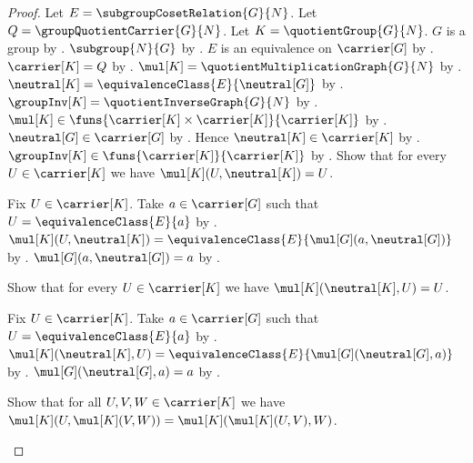 \begin{proof}
    Let $E=\subgroupCosetRelation{G}{N}$.
    Let $Q=\groupQuotientCarrier{G}{N}$.
    Let $K=\quotientGroup{G}{N}$.
    $G$ is a group by .
    $\subgroup{N}{G}$ by .
    $E$ is an equivalence on $\carrier[G]$ by
        .
    $\carrier[K]=Q$ by .
    $\mul[K]=\quotientMultiplicationGraph{G}{N}$ by
        .
    $\neutral[K]=\equivalenceClass{E}{\neutral[G]}$ by
        .
    $\groupInv[K]=\quotientInverseGraph{G}{N}$ by
        .
    $\mul[K]\in\funs{\carrier[K]\times\carrier[K]}{\carrier[K]}$ by
        .
    $\neutral[G]\in\carrier[G]$ by
        .
    Hence $\neutral[K]\in\carrier[K]$ by
        .
    $\groupInv[K]\in\funs{\carrier[K]}{\carrier[K]}$ by
        .
    Show that for every $U\in\carrier[K]$ we have
        $\mul[K](U,\neutral[K])=U$.
    \begin{subproof}
        Fix $U\in\carrier[K]$.
        Take $a\in\carrier[G]$ such that
            $U=\equivalenceClass{E}{a}$ by
            .
        $\mul[K](U,\neutral[K])=
            \equivalenceClass{E}{\mul[G](a,\neutral[G])}$ by
            .
        $\mul[G](a,\neutral[G])=a$ by
            .
    \end{subproof}
    Show that for every $U\in\carrier[K]$ we have
        $\mul[K](\neutral[K],U)=U$.
    \begin{subproof}
        Fix $U\in\carrier[K]$.
        Take $a\in\carrier[G]$ such that
            $U=\equivalenceClass{E}{a}$ by
            .
        $\mul[K](\neutral[K],U)=
            \equivalenceClass{E}{\mul[G](\neutral[G],a)}$ by
            .
        $\mul[G](\neutral[G],a)=a$ by
            .
    \end{subproof}
    Show that for all $U,V,W\in\carrier[K]$ we have
        $\mul[K](U,\mul[K](V,W))=
            \mul[K](\mul[K](U,V),W)$.
    \begin{subproof}

\end{subproof}
\end{proof}
